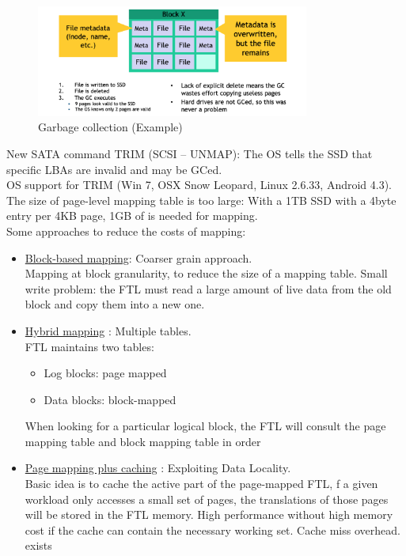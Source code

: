 \documentclass[10pt, oneside]{article}
\begin{document}
\begin{figure}[H]
    \begin{center}
    \includegraphics[width=0.8\textwidth]{img/img17.png}
    \caption{Garbage collection (Example)}
    \label{fig:GC ex}
    \end{center}
\end{figure}
New SATA command TRIM (SCSI – UNMAP): The OS tells the SSD that specific LBAs are invalid and may be GCed.\\
OS support for TRIM (Win 7, OSX Snow Leopard, Linux 2.6.33, Android 4.3).\\
\newline
The size of page-level mapping table is too large:
With a 1TB SSD with a 4byte entry per 4KB page, 1GB of is needed for mapping.\\
Some approaches to reduce the costs of mapping:
\begin{itemize}
    \item \underline{Block-based mapping}: Coarser grain approach.\\
    Mapping at block granularity, to reduce the size of a mapping table. Small write problem: the FTL must read a large amount of live data from the old block and copy them into a new one.
    \item \underline{Hybrid mapping} : Multiple tables.\\
    FTL maintains two tables:
    \begin{itemize}
        \item Log blocks: page mapped
        \item Data blocks: block-mapped
    \end{itemize}
    When looking for a particular logical block, the FTL will consult the page mapping table and block mapping table in order
    \item \underline{Page mapping plus caching} : Exploiting Data Locality.\\
    Basic idea is to cache the active part of the page-mapped FTL, f a given workload only accesses a small set of pages, the translations of those pages will be stored in the FTL memory. High performance without high memory cost if the cache can contain the necessary working set. Cache miss overhead. exists
\end{itemize}
\end{document}
